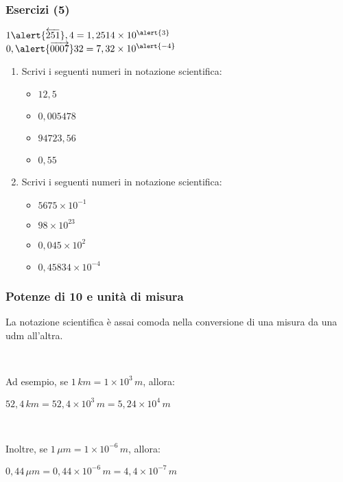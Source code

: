 \documentclass[]{beamer}
\begin{document}
\begin{frame}
\frametitle{Esercizi (5)}
\begin{center}
$ 1\alert{\overleftarrow{251}} ,4 = 1,2514 \times 10^{\alert{3}} $~~~~~~~$ 0,\alert{\overrightarrow{0007}}32 = 7,32 \times 10^{\alert{-4}} $
\end{center}
\begin{enumerate}
  \item Scrivi i seguenti numeri in notazione scientifica:
  \begin{multicols}{2}
    \begin{itemize}
        \item $ 12,5 $
        \item $ 0,005478 $
        \item $ 94723,56 $
        \item $ 0,55 $
    \end{itemize}
  \end{multicols}
  \item Scrivi i seguenti numeri in notazione scientifica:
  \begin{multicols}{2}
    \begin{itemize}
        \item $ 5675 \times 10^{-1} $
        \item $ 98 \times 10^{23} $
        \item $ 0,045 \times 10^2 $
        \item $ 0,45834 \times 10^{-4} $
    \end{itemize}
  \end{multicols}
\end{enumerate}
\end{frame}


\begin{frame}
\frametitle{Potenze di 10 e unità di misura}
La notazione scientifica è assai comoda nella conversione di una misura da una udm all'altra.\pause

~

Ad esempio, se $ 1 \, km = 1 \times 10^{3} \, m $, allora:
\begin{center}
$ 52,4 \, km = 52,4 \times 10^{3} \, m = 5,24 \times 10^{4} \, m $
\end{center}\pause

~

Inoltre, se $ 1 \, \mu m = 1 \times 10^{-6} \, m $, allora:
\begin{center}
$ 0,44 \, \mu m = 0,44 \times 10^{-6} \, m = 4,4 \times 10^{-7} \, m $
\end{center}
\end{frame}
\end{document}
